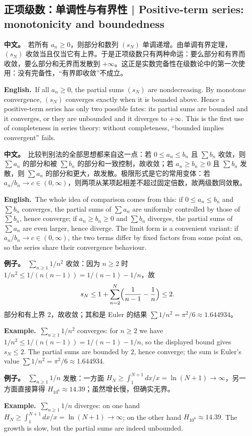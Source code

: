 \documentclass[UTF8,11pt,a4paper]{ctexart}
\newcommand{\BOTH}[2]{\par\noindent\textbf{中文。}\ #1\par\noindent\textbf{English.}\ #2\par}
\newcommand{\EX}[2]{\par\noindent\textbf{例子。}\ #1\par\noindent\textbf{Example.}\ #2\par}
\begin{document}
\subsection{正项级数：单调性与有界性 | Positive-term series: monotonicity and boundedness}
\BOTH{若所有 $a_n\ge0$，则部分和数列 $(s_N)$ 单调递增。由单调有界定理，$(s_N)$ 收敛当且仅当它有上界。于是正项级数只有两种命运：要么部分和有界而收敛，要么部分和无界而发散到 $+\infty$。这正是实数完备性在级数论中的第一次使用：没有完备性，“有界即收敛”不成立。}{If all $a_n\ge0$, the partial sums $(s_N)$ are nondecreasing. By monotone convergence, $(s_N)$ converges exactly when it is bounded above. Hence a positive-term series has only two possible fates: its partial sums are bounded and it converges, or they are unbounded and it diverges to $+\infty$. This is the first use of completeness in series theory: without completeness, “bounded implies convergent” fails.}
\BOTH{比较判别法的全部思想都来自这一点：若 $0\le a_n\le b_n$ 且 $\sum b_n$ 收敛，则 $\sum a_n$ 的部分和被 $\sum b_n$ 的部分和一致控制，故收敛；若 $a_n\ge b_n\ge0$ 且 $\sum b_n$ 发散，则 $\sum a_n$ 的部分和更大，故发散。极限形式是它的常用变体：若 $a_n/b_n\to c\in(0,\infty)$，则两项从某项起相差不超过固定倍数，故两级数同敛散。}{The whole idea of comparison comes from this: if $0\le a_n\le b_n$ and $\sum b_n$ converges, the partial sums of $\sum a_n$ are uniformly controlled by those of $\sum b_n$, hence converge; if $a_n\ge b_n\ge0$ and $\sum b_n$ diverges, the partial sums of $\sum a_n$ are even larger, hence diverge. The limit form is a convenient variant: if $a_n/b_n\to c\in(0,\infty)$, the two terms differ by fixed factors from some point on, so the series share their convergence behaviour.}
\EX{$\sum_{n\ge1}1/n^2$ 收敛：因为 $n\ge2$ 时 $1/n^2\le1/(n(n-1))=1/(n-1)-1/n$，故
\[
s_N\le1+\sum_{n=2}^{N}\Bigl(\frac1{n-1}-\frac1n\Bigr)\le2 .
\]
部分和有上界 $2$，故收敛；其和是 Euler 的结果 $\sum1/n^2=\pi^2/6\approx1.644934$。}{$\sum_{n\ge1}1/n^2$ converges: for $n\ge2$ we have $1/n^2\le1/(n(n-1))=1/(n-1)-1/n$, so the displayed bound gives $s_N\le2$. The partial sums are bounded by $2$, hence converge; the sum is Euler's value $\sum1/n^2=\pi^2/6\approx1.644934$.}
\EX{$\sum_{n\ge1}1/n$ 发散：一方面 $H_N\ge\int_1^{N+1}dx/x=\ln(N+1)\to\infty$，另一方面直接算得 $H_{10^6}\approx14.39$；虽然增长慢，但确实无界。}{$\sum_{n\ge1}1/n$ diverges: on one hand $H_N\ge\int_1^{N+1}dx/x=\ln(N+1)\to\infty$; on the other hand $H_{10^6}\approx14.39$. The growth is slow, but the partial sums are indeed unbounded.}
\end{document}
